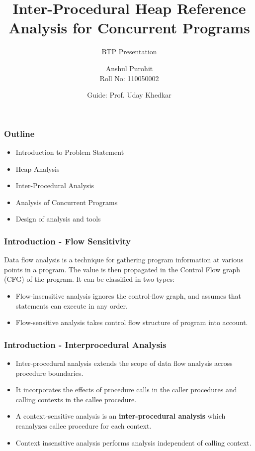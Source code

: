 \documentclass{beamer}
\title[Inter-procedural \& Concurrent HRA] %
{Inter-Procedural Heap Reference Analysis for Concurrent Programs}
\subtitle{BTP Presentation}
\author[Anshul Purohit] %
{
Anshul Purohit \\
Roll No: 110050002 \\
}
\institute[Universitäten Hier und Dort] %
{
	
}
\date[KPT 2004] %
{
Guide: Prof. Uday Khedkar \\
}
\begin{document}
\frame{\titlepage}
\begin{frame}

\frametitle{Outline}
\begin{itemize}
\item Introduction to Problem Statement
\item Heap Analysis 
\item Inter-Procedural Analysis
\item Analysis of Concurrent Programs
\item Design of analysis and tools
\end{itemize}
\end{frame}

  \begin{frame}
    \frametitle{Introduction - Flow Sensitivity}

Data flow analysis is a technique for gathering program information at various points in a program. The value is then propagated in the Control Flow graph (CFG) of the program. It can be classified in two types:

\begin{itemize}
	\item  Flow-insensitive analysis ignores the control-flow graph, and assumes that statements can execute in any order.
	\item Flow-sensitive analysis takes control flow structure of program into account.	
\end{itemize}
  \end{frame}
  
  \begin{frame}
    \frametitle{Introduction - Interprocedural Analysis}

\begin{itemize}
	
	\item Inter-procedural analysis extends the scope of data flow analysis across procedure boundaries.
	\item It incorporates the effects of procedure calls in the caller procedures and calling contexts in the callee procedure.
	\item A context-sensitive analysis is an \textbf{inter-procedural analysis} which reanalyzes callee procedure for each context. \item Context insensitive analysis performs analysis independent of calling context.
	
\end{itemize}
	\end{frame}
	
\end{document}
